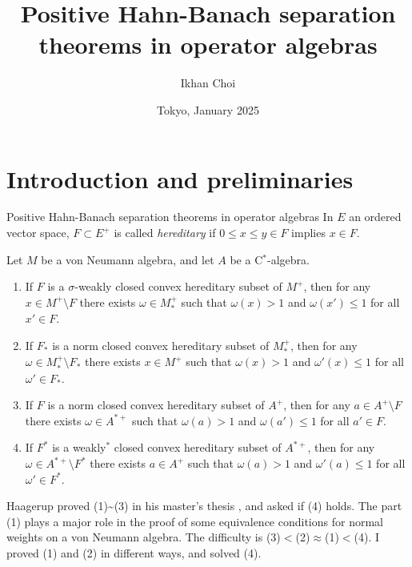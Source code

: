 \documentclass{../../../../slide}
\title{Positive Hahn-Banach separation theorems in operator algebras}
\author{Ikhan Choi}
\institute{The University of Tokyo}
\date{Tokyo, January 2025}
\begin{document}
\begin{frame}[plain]
\titlepage
\end{frame}



\section{Introduction and preliminaries}
\contents


\begin{frame}{Positive Hahn-Banach separation theorems in operator algebras}
In $E$ an ordered vector space, $F\subset E^+$ is called \emph{hereditary} if $0\le x\le y\in F$ implies $x\in F$.
\begin{thm}[Haagerup '75, C. '25]
Let $M$ be a von Neumann algebra, and let $A$ be a C$^*$-algebra.
\begin{enumerate}[(1)]
\item If $F$ is a $\sigma$-weakly closed convex hereditary subset of $M^+$, then for any $x\in M^+\setminus F$ there exists $\omega\in M_*^+$ such that $\omega(x)>1$ and $\omega(x')\le1$ for all $x'\in F$.
\item If $F_*$ is a norm closed convex hereditary subset of $M_*^+$, then for any $\omega\in M_*^+\setminus F_*$ there exists $x\in M^+$ such that $\omega(x)>1$ and $\omega'(x)\le1$ for all $\omega'\in F_*$.
\item If $F$ is a norm closed convex hereditary subset of $A^+$, then for any $a\in A^+\setminus F$\qquad there exists $\omega\in A^{*+}$ such that $\omega(a)>1$ and $\omega(a')\le1$ for all $a'\in F$.
\item If $F^*$ is a weakly$^*$ closed convex hereditary subset of $A^{*+}$, then for any $\omega\in A^{*+}\setminus F^*$ there exists $a\in A^+$ such that $\omega(a)>1$ and $\omega'(a)\le1$ for all $\omega'\in F^*$.
\end{enumerate}
\end{thm}
\pause
Haagerup proved (1)\sim(3) in his master's thesis \cite{MR380438}, and asked if (4) holds.
The part (1) plays a major role in the proof of some equivalence conditions for normal weights on a von Neumann algebra.
The difficulty is (3)$<$(2)$\approx$(1)$<$(4).
I proved (1) and (2) in different ways, and solved (4).
\end{frame}
\end{document}
